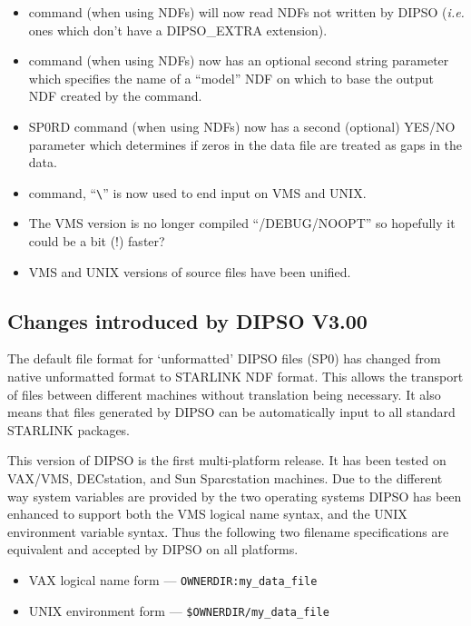 \documentclass[twoside,11pt,noabs,nolof]{starlink}
\begin{document}
\begin{itemize}
\item {}  command (when using NDFs) will now read NDFs not written by
DIPSO (\emph{i.e.} ones which don't have a DIPSO\_EXTRA extension).

\item {}  command (when using NDFs) now has an optional second string
parameter which specifies the name of a ``model'' NDF on which to base
the output NDF created by the   command.

\item SP0RD command (when using NDFs) now has a second (optional)
YES/NO parameter which determines if zeros in the data file are treated
as gaps in the data.

\item {}  command, ``\verb+\+'' is now used to end input on VMS
and UNIX.

\item The VMS version is no longer compiled ``/DEBUG/NOOPT'' so
hopefully it could be a bit (!) faster?

\item VMS and UNIX versions of source files have been unified.

\end{itemize}

\subsection{ Changes introduced by DIPSO V3.00}

The default file format for `unformatted' DIPSO files (SP0) has
changed from native unformatted format to STARLINK NDF format. This
allows the transport of files between different machines without
translation being necessary. It also means that files generated by
DIPSO can be automatically input to all standard STARLINK packages.

This version of DIPSO is the first multi-platform release. It has been
tested on VAX/VMS, DECstation, and Sun Sparcstation machines.
Due to the different way system variables are provided by the two
operating systems DIPSO has been enhanced to support both the VMS
logical name syntax, and the UNIX environment variable syntax. Thus
the following two filename specifications are equivalent and accepted
by DIPSO on all platforms.

\begin{itemize}
\item{VAX logical name form --- {\texttt{OWNERDIR:my\_data\_file}}}
\item{UNIX environment form --- {\texttt{\$OWNERDIR/my\_data\_file}}}
\end{itemize}
\end{document}
